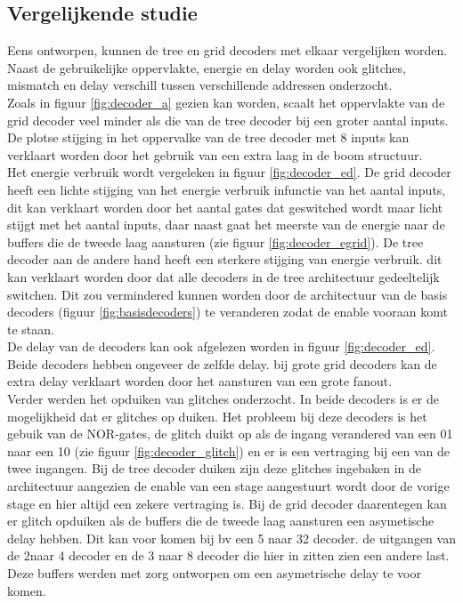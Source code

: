 \subsection{Vergelijkende studie}
Eens ontworpen, kunnen de tree en grid decoders met elkaar vergelijken worden. Naast de gebruikelijke oppervlakte, energie en delay worden ook glitches, mismatch en delay verschill tussen verschillende addressen onderzocht. \\
Zoals in figuur \ref{fig:decoder_a} gezien kan worden, scaalt het oppervlakte van de grid decoder veel minder als die van de tree decoder bij een groter aantal inputs. De plotse stijging in het oppervalke van de tree decoder met 8 inputs kan verklaart worden door het gebruik van een extra laag in de boom structuur. \\
Het energie verbruik wordt vergeleken in figuur \ref{fig:decoder_ed}. De grid decoder heeft een lichte stijging van het energie verbruik infunctie van het aantal inputs, dit kan verklaart worden door het aantal gates dat geswitched wordt maar licht stijgt met het aantal inputs, daar naast gaat het meerste van de energie naar de buffers die de tweede laag aansturen (zie figuur \ref{fig:decoder_egrid}). De tree decoder aan de andere hand heeft een sterkere stijging van energie verbruik. dit kan verklaart worden door dat alle decoders in de tree architectuur gedeeltelijk switchen. Dit zou vermindered kunnen worden door de architectuur van de basis decoders (figuur \ref{fig:basisdecoders}) te veranderen zodat de enable vooraan komt te staan.\\
De delay van de decoders kan ook afgelezen worden in figuur \ref{fig:decoder_ed}. Beide decoders hebben ongeveer de zelfde delay. bij grote grid decoders kan de extra delay verklaart worden door het aansturen van een grote fanout.\\
Verder werden het opduiken van glitches onderzocht. In beide decoders is er de mogelijkheid dat er glitches op duiken. Het probleem bij deze decoders is het gebuik van de NOR-gates, de glitch duikt op als de ingang verandered van een 01 naar een 10 (zie figuur \ref{fig:decoder_glitch}) en er is een vertraging bij een van de twee ingangen. Bij de tree decoder duiken zijn deze glitches ingebaken in de architectuur aangezien de enable van een stage aangestuurt wordt door de vorige stage en hier altijd een zekere vertraging is. Bij de grid decoder daarentegen kan er glitch opduiken als de buffers die de tweede laag aansturen een asymetische delay hebben. Dit kan voor komen bij bv een 5 naar 32 decoder. de uitgangen van de 2naar 4 decoder en de 3 naar 8 decoder die hier in zitten zien een andere last. Deze buffers werden met zorg ontworpen om een asymetrische delay te voor komen.\\
